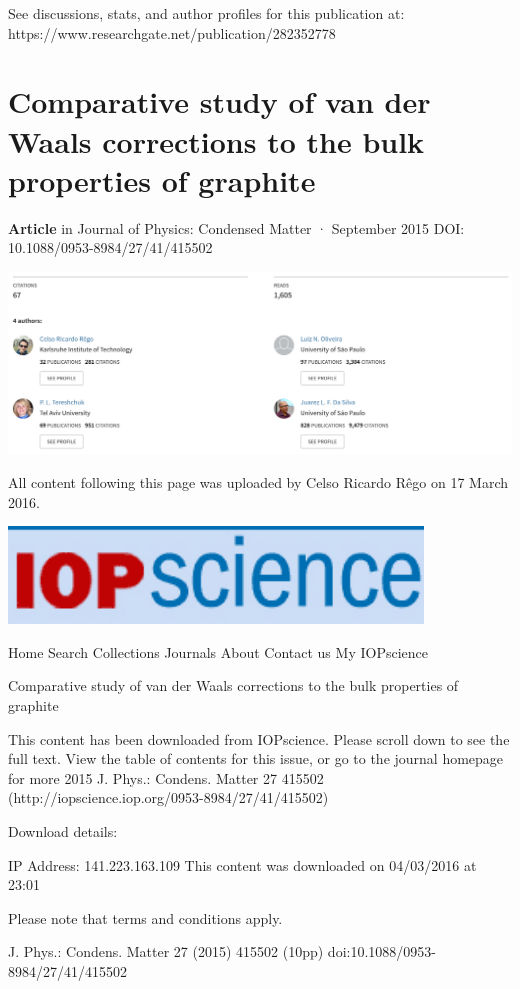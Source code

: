 \documentclass{article}
\begin{document}
See discussions, stats, and author profiles for this publication at: https://www.researchgate.net/publication/282352778

\section{Comparative study of van der Waals corrections to the bulk properties of graphite}

\textbf{Article} in Journal of Physics: Condensed Matter · September 2015 DOI: 10.1088/0953-8984/27/41/415502


\includegraphics{_page_0_Picture_4.png}


All content following this page was uploaded by Celso Ricardo Rêgo on 17 March 2016.


\includegraphics{_page_1_Picture_0.png}


Home Search Collections Journals About Contact us My IOPscience

Comparative study of van der Waals corrections to the bulk properties of graphite

This content has been downloaded from IOPscience. Please scroll down to see the full text. View the table of contents for this issue, or go to the journal homepage for more 2015 J. Phys.: Condens. Matter 27 415502 (http://iopscience.iop.org/0953-8984/27/41/415502)

Download details:

IP Address: 141.223.163.109 This content was downloaded on 04/03/2016 at 23:01

Please note that terms and conditions apply.

J. Phys.: Condens. Matter 27 (2015) 415502 (10pp) doi:10.1088/0953-8984/27/41/415502
\end{document}
